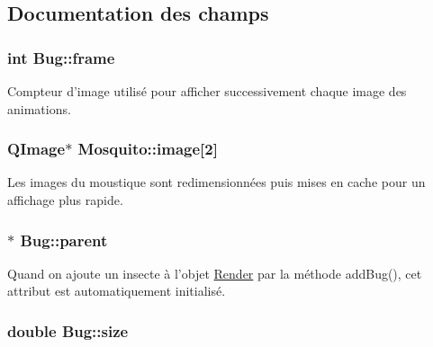 \subsection{Documentation des champs}
\hypertarget{classBug_ad7e3597cf049f1051be94fcaf2fd3598}{
\subsubsection[{frame}]{\setlength{\rightskip}{0pt plus 5cm}int {\bf Bug::frame}}}
\label{classBug_ad7e3597cf049f1051be94fcaf2fd3598}
Compteur d'image utilisé pour afficher successivement chaque image des animations. \hypertarget{classMosquito_a8c451b0473a7d48ee0ed7de9627f46cb}{
\subsubsection[{image}]{\setlength{\rightskip}{0pt plus 5cm}QImage$\ast$ {\bf Mosquito::image}\mbox{[}2\mbox{]}}}
\label{classMosquito_a8c451b0473a7d48ee0ed7de9627f46cb}
Les images du moustique sont redimensionnées puis mises en cache pour un affichage plus rapide. \hypertarget{classBug_a7a93aae4e4b7a215c94ff85d0bd6e26d}{
\subsubsection[{parent}]{$\ast$ {\bf Bug::parent}}}
\label{classBug_a7a93aae4e4b7a215c94ff85d0bd6e26d}
Quand on ajoute un insecte à l'objet \hyperlink{classRender}{Render} par la méthode addBug(), cet attribut est automatiquement initialisé. \hypertarget{classBug_a27a0f0b84d15525e409955509e6e3c42}{
\subsubsection[{size}]{\setlength{\rightskip}{0pt plus 5cm}double {\bf Bug::size}}}

